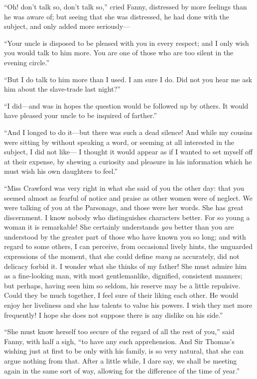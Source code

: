 \documentclass{article}
\begin{document}
``Oh! don't talk so, don't talk so,'' cried Fanny,
distressed by more feelings than he was aware of; but seeing
that she was distressed, he had done with the subject,
and only added more seriously---%

``Your uncle is disposed to be pleased with you in
every respect; and I only wish you would talk to him more.
You are one of those who are too silent in the evening circle.''

``But I do talk to him more than I used.  I am sure I do.
Did not you hear me ask him about the slave-trade
last night?''

``I did---and was in hopes the question would be followed
up by others.  It would have pleased your uncle to be
inquired of farther.''

``And I longed to do it---but there was such a dead silence!
And while my cousins were sitting by without speaking a word,
or seeming at all interested in the subject, I did not like---%
I thought it would appear as if I wanted to set myself
off at their expense, by shewing a curiosity and pleasure
in his information which he must wish his own daughters
to feel.''

``Miss Crawford was very right in what she said of you
the other day:  that you seemed almost as fearful of notice
and praise as other women were of neglect.  We were talking
of you at the Parsonage, and those were her words.
She has great discernment.  I know nobody who distinguishes
characters better.  For so young a woman it is remarkable!
She certainly understands \emph{you} better than you are
understood by the greater part of those who have known you
so long; and with regard to some others, I can perceive,
from occasional lively hints, the unguarded expressions
of the moment, that she could define \emph{many} as accurately,
did not delicacy forbid it.  I wonder what she thinks
of my father!  She must admire him as a fine-looking man,
with most gentlemanlike, dignified, consistent manners;
but perhaps, having seen him so seldom, his reserve
may be a little repulsive.  Could they be much together,
I feel sure of their liking each other.  He would enjoy
her liveliness and she has talents to value his powers.
I wish they met more frequently!  I hope she does not suppose
there is any dislike on his side.''

``She must know herself too secure of the regard of all
the rest of you,'' said Fanny, with half a sigh, ``to have
any such apprehension.  And Sir Thomas's wishing just at
first to be only with his family, is so very natural,
that she can argue nothing from that.  After a little while,
I dare say, we shall be meeting again in the same sort
of way, allowing for the difference of the time of year.''
\end{document}
